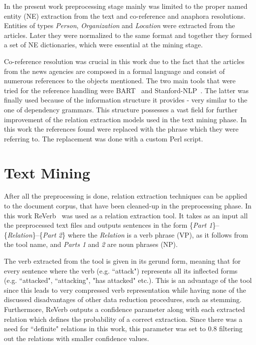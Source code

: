 \documentclass[]{article}
\begin{document}
In the present work preprocessing stage mainly was limited to the proper named entity (NE) extraction from the text and co-reference and anaphora resolutions. Entities of types \textit{Person}, \textit{Organization} and \textit{Location} were extracted from the articles. Later they were normalized to the same format and together they formed a set of NE dictionaries, which were essential at the mining stage. 

Co-reference resolution was crucial in this work due to the fact that the articles from the news agencies are composed in a formal language and consist of numerous references to the objects mentioned. The two main tools that were tried for the reference handling were BART~\cite{bart} and  Stanford-NLP~\cite{stanford}. The latter was finally used because of the information structure it provides - very similar to the one of dependency grammars. This structure possesses a vast field for further improvement of the relation extraction models used in the text mining phase. In this work the references found were replaced with the phrase which they were referring to. The replacement was done with a custom Perl script.
%
\section{Text Mining}
%
After all the preprocessing is done, relation extraction techniques can be applied to the document corpus, that have been cleaned-up in the preprocessing phase. In this work ReVerb~\cite{reverb} was used as a relation extraction tool. It takes as an input all the preprocessed text files and outputs sentences in the form \{\textit{Part 1}\}--\{\textit{Relation}\}--\{\textit{Part 2}\} where the \textit{Relation} is a verb phrase (VP), as it follows from the tool name, and \textit{Parts 1} and \textit{2} are noun phrases (NP). 

The verb extracted from the tool is given in its gerund form, meaning that for every sentence where the verb (e.g. ``attack") represents all its inflected forms (e.g. ``attacked", ``attacking", "has attacked" etc.). This is an advantage of the tool since this leads to very compressed verb representation while having none of the discussed disadvantages of other data reduction procedures, such as stemming. Furthermore, ReVerb outputs a confidence parameter along with each extracted relation which defines the probability of a correct extraction. Since there was a need for ``definite" relations in this work, this parameter was set to 0.8 filtering out the relations with smaller confidence values. 
\end{document}

